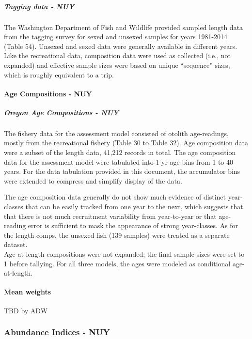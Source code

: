 \documentclass[11pt,
  english,
  letterpaper,
]{article}
\begin{document}
\hypertarget{tagging-data---nuy}{%
\subparagraph{Tagging data - NUY}\label{tagging-data---nuy}}

The Washington Department of Fish and Wildlife provided sampled length data from the tagging survey for sexed and unsexed samples for years 1981-2014 (Table 54). Unsexed and sexed data were generally available in different years. Like the recreational data, composition data were used as collected (i.e., not expanded) and effective sample sizes were based on unique ``sequence'' sizes, which is roughly equivalent to a trip.

\hypertarget{age-compositions---nuy}{%
\paragraph{Age Compositions - NUY}\label{age-compositions---nuy}}

\hypertarget{oregon-age-compositions---nuy}{%
\subparagraph{Oregon Age Compositions - NUY}\label{oregon-age-compositions---nuy}}

The fishery data for the assessment model consisted of otolith age-readings, mostly from the recreational fishery (Table 30 to Table 32). Age composition data were a subset of the length data, 41,212 records in total. The age composition data for the assessment model were tabulated into 1-yr age bins from 1 to 40 years. For the data tabulation provided in this document, the accumulator bins were extended to compress and simplify display of the data.

The age composition data generally do not show much evidence of distinct year-classes that can be easily tracked from one year to the next, which suggests that that there is not much recruitment variability from year-to-year or that age-reading error is sufficient to mask the appearance of strong year-classes. As for the length comps, the unsexed fish (139 samples) were treated as a separate dataset.\\
Age-at-length compositions were not expanded; the final sample sizes were set to 1 before tallying. For all three models, the ages were modeled as conditional age-at-length.

\hypertarget{mean-weights}{%
\paragraph{Mean weights}\label{mean-weights}}

TBD by ADW

\hypertarget{abundance-indices---nuy}{%
\subsubsection{Abundance Indices - NUY}\label{abundance-indices---nuy}}
\end{document}
